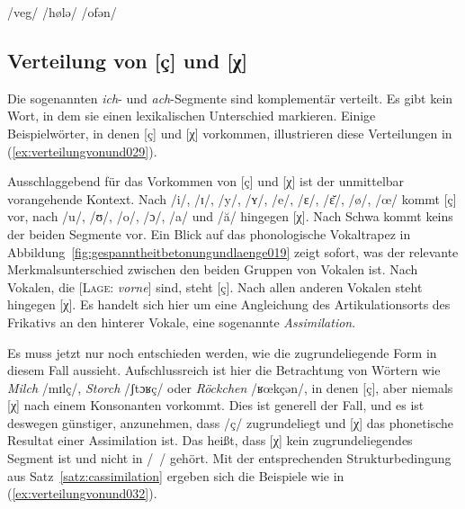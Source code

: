 \begin{exe}
  \ex\label{ex:gespanntheitbetonungundlaenge028} \begin{xlist}
    \ex /veg/ \phopro [veːk]
    \ex /hølə/ \phopro [høːlə]
    \ex /ofən/ \phopro [ʔoːfən]
  \end{xlist}
\end{exe}

\subsection{Verteilung von [ç] und [χ]}
\label{sec:verteilungvonund}

Die sogenannten \textit{ich}- und \textit{ach}-Segmente sind komplementär verteilt.
Es gibt kein Wort, in dem sie einen lexikalischen Unterschied markieren.
Einige Beispielwörter, in denen [ç] und [χ] vorkommen, illustrieren diese Verteilungen in (\ref{ex:verteilungvonund029}).

\begin{exe}
  \ex\label{ex:verteilungvonund029}
  \begin{xlist}
  \end{xlist}
\end{exe}

Ausschlaggebend für das Vorkommen von [ç] und [χ] ist der unmittelbar vorangehende Kontext.
Nach /i/, /ɪ/, /y/, /ʏ/, /e/, /ɛ/, /ɛ̆/, /ø/, /œ/ kommt [ç] vor, nach /u/, /ʊ/, /o/, /ɔ/, /a/ und /ă/ hingegen [χ].
Nach Schwa kommt keins der beiden Segmente vor.
Ein Blick auf das phonologische Vokaltrapez in Abbildung~\ref{fig:gespanntheitbetonungundlaenge019} zeigt sofort, was der relevante Merkmalsunterschied zwischen den beiden Gruppen von Vokalen ist.
Nach Vokalen, die [\textsc{Lage}: \textit{vorne}] sind, steht [ç].
Nach allen anderen Vokalen steht hingegen [χ].
Es handelt sich hier um eine Angleichung des Artikulationsorts des Frikativs an den hinterer Vokale, eine sogenannte \textit{Assimilation}.

Es muss jetzt nur noch entschieden werden, wie die zugrundeliegende Form in diesem Fall aussieht.
Aufschlussreich ist hier die Betrachtung von Wörtern wie \textit{Milch} /mɪlç/, \textit{Storch} /ʃtɔʁç/ oder \textit{Röckchen} /ʁœkçən/, in denen [ç], aber niemals [χ] nach einem Konsonanten vorkommt.
Dies ist generell der Fall, und es ist deswegen günstiger, anzunehmen, dass /ç/ zugrundeliegt und [χ] das phonetische Resultat einer Assimilation ist.
Das heißt, dass [χ] kein zugrundeliegendes Segment ist und nicht in /~/ gehört.
Mit der entsprechenden Strukturbedingung aus Satz~\ref{satz:cassimilation} ergeben sich die Beispiele wie in (\ref{ex:verteilungvonund032}).


